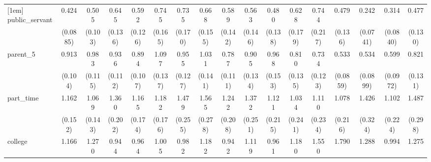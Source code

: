 {\begin{tabular}{l*{16}{c}}
[1em]
public\_servant      &       0.424\sym{***}&       0.505\sym{***}&       0.645\sym{*}  &       0.592\sym{*}  &       0.745         &       0.735         &       0.668         &       0.589\sym{*}  &       0.563\sym{*}  &       0.480\sym{*}  &       0.628         &       0.744         &       0.479\sym{**} &       0.242\sym{***}&       0.314\sym{***}&       0.477\sym{**} \\
                    &    (0.0885)         &     (0.103)         &     (0.136)         &     (0.126)         &     (0.165)         &     (0.170)         &     (0.155)         &     (0.142)         &     (0.146)         &     (0.138)         &     (0.179)         &     (0.217)         &     (0.136)         &    (0.0741)         &    (0.0840)         &     (0.130)         \\
[1em]
parent\_5            &       0.913         &       0.983         &       0.936         &       0.894         &       1.097         &       0.955         &       1.031         &       0.787         &       0.905         &       0.968         &       0.810         &       0.734         &       0.533\sym{***}&       0.534\sym{***}&       0.599\sym{**} &       0.821         \\
                    &     (0.104)         &     (0.115)         &     (0.112)         &     (0.107)         &     (0.137)         &     (0.127)         &     (0.141)         &     (0.111)         &     (0.134)         &     (0.153)         &     (0.135)         &     (0.123)         &    (0.0859)         &    (0.0899)         &    (0.0972)         &     (0.131)         \\
[1em]
part\_time           &       1.162         &       1.069         &       1.360\sym{*}  &       1.165         &       1.182         &       1.479\sym{*}  &       1.565\sym{*}  &       1.242         &       1.372         &       1.121         &       1.034         &       1.110         &       1.078         &       1.426         &       1.102         &       1.487\sym{*}  \\
                    &     (0.152)         &     (0.143)         &     (0.202)         &     (0.174)         &     (0.176)         &     (0.255)         &     (0.278)         &     (0.208)         &     (0.251)         &     (0.215)         &     (0.241)         &     (0.234)         &     (0.216)         &     (0.324)         &     (0.224)         &     (0.298)         \\
[1em]
college             &       1.166         &       1.270         &       0.944         &       0.964         &       1.005         &       0.982         &       1.182         &       0.942         &       1.119         &       0.961         &       1.180         &       1.550\sym{*}  &       1.790\sym{**} &       1.288         &       0.994         &       1.275         \\

\end{tabular}}
